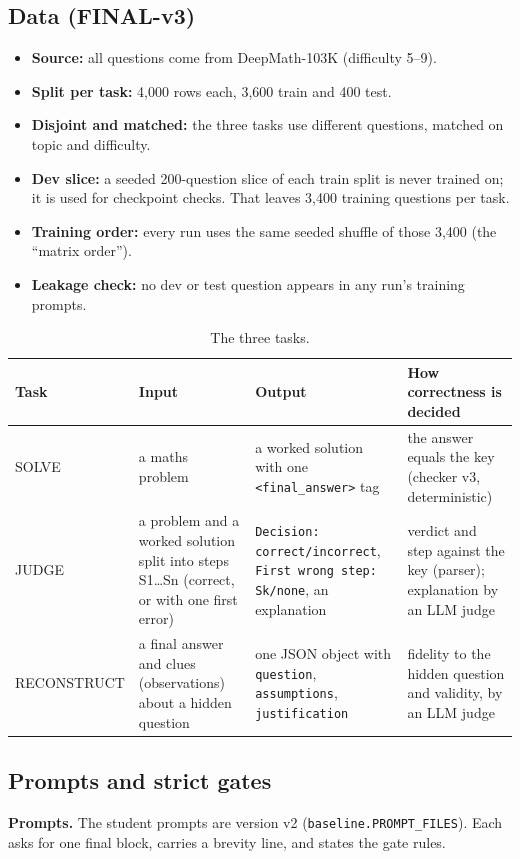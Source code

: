 \documentclass[10pt,a4paper]{article}
\begin{document}
\subsection{Data (FINAL-v3)}
\begin{itemize}
\item \textbf{Source:} all questions come from DeepMath-103K (difficulty 5--9).
\item \textbf{Split per task:} 4,000 rows each, 3,600 train and 400 test.
\item \textbf{Disjoint and matched:} the three tasks use different questions, matched on topic and difficulty.
\item \textbf{Dev slice:} a seeded 200-question slice of each train split is never trained on; it is used for
      checkpoint checks. That leaves 3,400 training questions per task.
\item \textbf{Training order:} every run uses the same seeded shuffle of those 3,400 (the ``matrix order'').
\item \textbf{Leakage check:} no dev or test question appears in any run's training prompts.
\end{itemize}

\begin{table}[H]
\centering\small
\caption{The three tasks.}
\begin{tabular}{p{2.2cm}p{4.2cm}p{4.6cm}p{4.6cm}}
\toprule
Task & Input & Output & How correctness is decided\\
\midrule
SOLVE & a maths problem & a worked solution with one \texttt{<final\_answer>} tag & the answer equals the key (checker v3, deterministic)\\
JUDGE & a problem and a worked solution split into steps S1\dots Sn (correct, or with one first error) & \texttt{Decision: correct/incorrect}, \texttt{First wrong step: Sk/none}, an explanation & verdict and step against the key (parser); explanation by an LLM judge\\
RECONSTRUCT & a final answer and clues (observations) about a hidden question & one JSON object with \texttt{question}, \texttt{assumptions}, \texttt{justification} & fidelity to the hidden question and validity, by an LLM judge\\
\bottomrule
\end{tabular}
\end{table}

\subsection{Prompts and strict gates}
\textbf{Prompts.} The student prompts are version v2 (\texttt{baseline.PROMPT\_FILES}). Each asks for one final
block, carries a brevity line, and states the gate rules.
\end{document}
